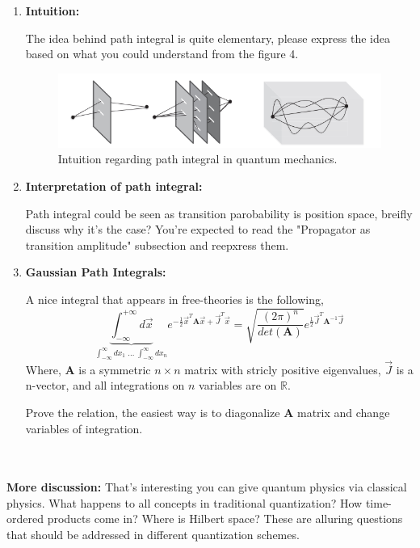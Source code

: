 \documentclass[11pt]{article}
\begin{document}
	\begin{enumerate}
	\item
	\begin{problem}{\points[Schwartz 14]{-}}
		\textbf{Intuition:} 
		
		\noindent
		The idea behind path integral is quite elementary, please express the idea based on what you could understand from the figure 4.
		\begin{figure}[H]
			\centering
			\includegraphics[width=0.7\linewidth]{img/pi1.png}
			\caption{Intuition regarding path integral in quantum mechanics.}
		\end{figure}
	\end{problem}
	\item
	\begin{problem}{\points[Sakurai 2.6]{-}}
		\textbf{Interpretation of path integral:}
		
		\noindent
		 Path integral could be seen as transition parobability is position space, breifly discuss why it's the case? You're expected to read the "Propagator as transition amplitude"‌ subsection and reepxress them.
		\noindent
	\end{problem}


	\item 
	\begin{problem}{\points{-}}
		\textbf{Gaussian Path Integrals:}
		
		\noindent
		A nice integral that appears in free-theories is the following,
		\[
		\underbrace{\int_{-\infty}^{+\infty} d \vec{x}}_{\int_{-\infty}^{\infty} dx_1\;\dots \;
		\int_{-\infty}^{\infty} dx_n
		} e^{-\frac12 \vec{x}^T \mathbf{A} \vec{x} +\vec{J}^T\vec{x}} = \sqrt{\frac{(2\pi)^n}{det(\mathbf{A})}}e^{\frac12\vec{J}^T\mathbf{A}^{-1} \vec{J}}
		\]
		Where, $\mathbf{A}$ is a symmetric $n\times n$ matrix with stricly positive eigenvalues, $\vec{J}$ is a n-vector, and all integrations on $n$ variables are on $\mathbb{R}$.
		
		\noindent
		Prove the relation, the easiest way is to diagonalize $\mathbf{A}$ matrix and change variables of integration.
	\end{problem}


\end{enumerate}
\noindent
\\
\\
\textbf{More discussion:} That's interesting you can give quantum physics via classical physics. What happens to all concepts in traditional quantization? How time-ordered products come in? Where is Hilbert space? These are alluring questions that should be addressed in different quantization schemes.
\end{document}
